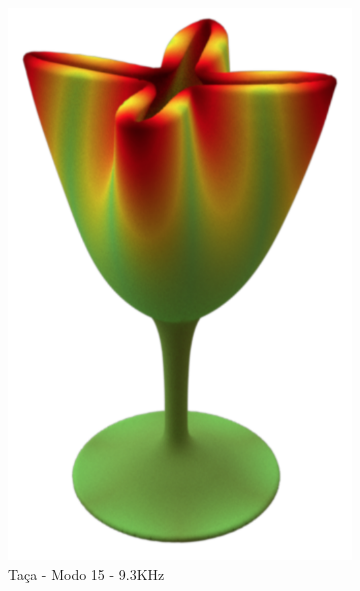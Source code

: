 \begin{figure}[ht]
\begin{subfigure}{0.32\textwidth}
	\includegraphics[height=0.2\textheight]{mathematicalbackground/modes/glass_15.png}
	\caption{Taça - Modo 15 - 9.3KHz}\label{fig:glass_15}
\end{subfigure}%
\begin{subfigure}{0.32\textwidth}
	\centering

\end{subfigure}
\end{figure}
